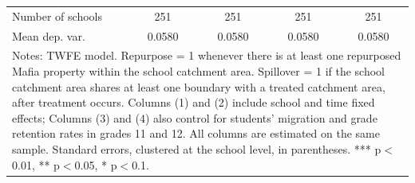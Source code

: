 \documentclass[12pt]{article}
\theoremstyle{plain}
\theoremstyle{plain}
\theoremstyle{plain}
\theoremstyle{definition}
\theoremstyle{plain}
\theoremstyle{definition}
\theoremstyle{plain}
\theoremstyle{remark}
\theoremstyle{definition}
\theoremstyle{definition}
\theoremstyle{plain}
\begin{document}
\begin{table}[H]
{\begin{tabular}{p{10.165em}llll}
			\multicolumn{1}{l}{Number of schools} & \multicolumn{1}{c}{251} & \multicolumn{1}{c}{251} & \multicolumn{1}{c}{251} & \multicolumn{1}{c}{251} \\
			\multicolumn{1}{l}{Mean dep. var.} & \multicolumn{1}{c}{0.0580} & \multicolumn{1}{c}{0.0580} & \multicolumn{1}{c}{0.0580} & \multicolumn{1}{c}{0.0580} \\
			\midrule
			\multicolumn{5}{p{30.165em}}{Notes: TWFE model. Repurpose = 1 whenever there is at least one repurposed Mafia property within the school catchment area. Spillover = 1 if the school catchment area shares at least one boundary with a treated catchment area, after treatment occurs. Columns (1) and (2) include school and time fixed effects; Columns (3) and (4) also control for students' migration and grade retention rates in grades 11 and 12. All columns are estimated on the same sample. Standard errors, clustered at the school level, in parentheses. *** p$<$0.01, ** p$<$0.05, * p$<$0.1.} \\
		\end{tabular}%
	}
\end{table}
\end{document}
